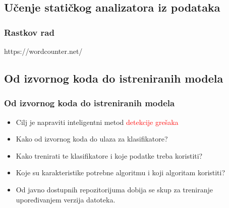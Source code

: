 \documentclass[11pt]{beamer}
\theoremstyle{definition}
\begin{document}
{%
\subsection{Učenje statičkog analizatora iz podataka}
\label{subsec:staticki-analizator}
\begin{frame}
\frametitle{Rastkov rad}
https://wordcounter.net/
\end{frame}




\subsection{Od izvornog koda do istreniranih modela}
\label{subsec:WEKA}
\begin{frame}
\frametitle{Od izvornog koda do istreniranih modela}


\begin{itemize}
\item Cilj je napraviti inteligentni metod \textcolor{red}{detekcije grešaka}
\item Kako od izvornog koda do ulaza za klasifikatore?
\item Kako trenirati te klasifikatore i koje podatke treba koristiti?
\item Koje su karakteristike potrebne algoritmu i koji algoritam koristiti?

\item Od javno dostupnih repozitorijuma dobija se skup za treniranje upoređivanjem verzija datoteka.

\end{itemize}
\end{frame}

{
\begin{frame}
\end{frame}
}

}
\end{document}
